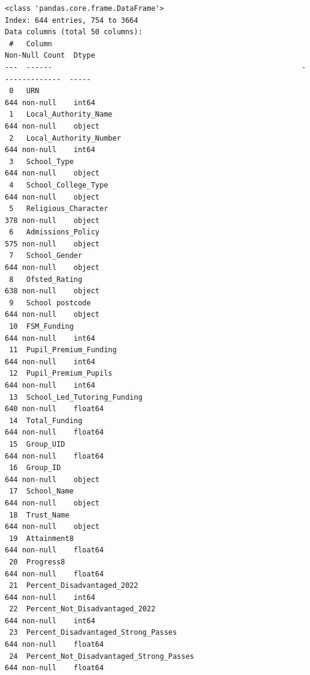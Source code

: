 \documentclass[
  letterpaper,
  DIV=11,
  numbers=noendperiod]{scrartcl}
\begin{document}
\begin{verbatim}
<class 'pandas.core.frame.DataFrame'>
Index: 644 entries, 754 to 3664
Data columns (total 50 columns):
 #   Column                                                          Non-Null Count  Dtype  
---  ------                                                          --------------  -----  
 0   URN                                                             644 non-null    int64  
 1   Local_Authority_Name                                            644 non-null    object 
 2   Local_Authority_Number                                          644 non-null    int64  
 3   School_Type                                                     644 non-null    object 
 4   School_College_Type                                             644 non-null    object 
 5   Religious_Character                                             378 non-null    object 
 6   Admissions_Policy                                               575 non-null    object 
 7   School_Gender                                                   644 non-null    object 
 8   Ofsted_Rating                                                   638 non-null    object 
 9   School postcode                                                 644 non-null    object 
 10  FSM_Funding                                                     644 non-null    int64  
 11  Pupil_Premium_Funding                                           644 non-null    int64  
 12  Pupil_Premium_Pupils                                            644 non-null    int64  
 13  School_Led_Tutoring_Funding                                     640 non-null    float64
 14  Total_Funding                                                   644 non-null    float64
 15  Group_UID                                                       644 non-null    float64
 16  Group_ID                                                        644 non-null    object 
 17  School_Name                                                     644 non-null    object 
 18  Trust_Name                                                      644 non-null    object 
 19  Attainment8                                                     644 non-null    float64
 20  Progress8                                                       644 non-null    float64
 21  Percent_Disadvantaged_2022                                      644 non-null    int64  
 22  Percent_Not_Disadvantaged_2022                                  644 non-null    int64  
 23  Percent_Disadvantaged_Strong_Passes                             644 non-null    float64
 24  Percent_Not_Disadvantaged_Strong_Passes                         644 non-null    float64

\end{verbatim}
\end{document}
